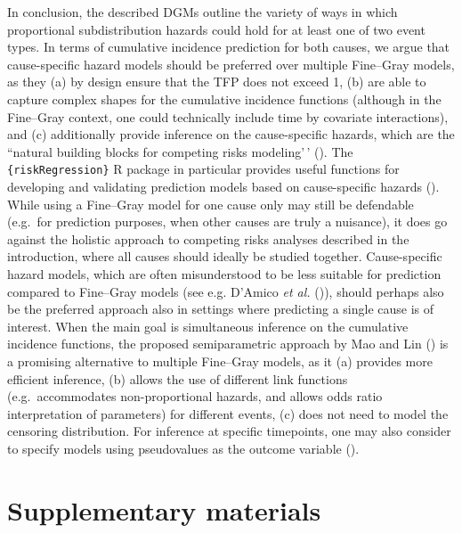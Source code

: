 \documentclass[
  letterpaper,
  paper=240mm:170mm,
  twoside=true,
  open=right,
  fontsize=10pt,
  pagesize=false,
  BCOR=15mm,
  DIV=14,
  headinclude=true,
  footinclude=false,
  headsepline=on]{scrbook}
\begin{document}
In conclusion, the described DGMs outline the variety of ways in which
proportional subdistribution hazards could hold for at least one of two
event types. In terms of cumulative incidence prediction for both
causes, we argue that cause-specific hazard models should be preferred
over multiple Fine--Gray models, as they (a) by design ensure that the
TFP does not exceed 1, (b) are able to capture complex shapes for the
cumulative incidence functions (although in the Fine--Gray context, one
could technically include time by covariate interactions), and (c)
additionally provide inference on the cause-specific hazards, which are
the ``natural building blocks for competing risks modeling'\,'
(). The \texttt{\{riskRegression\}} R package in particular
provides useful functions for developing and validating prediction
models based on cause-specific hazards
(). While using a
Fine--Gray model for one cause only may still be defendable (e.g.~for
prediction purposes, when other causes are truly a nuisance), it does go
against the holistic approach to competing risks analyses described in
the introduction, where all causes should ideally be studied together.
Cause-specific hazard models, which are often misunderstood to be less
suitable for prediction compared to Fine--Gray models (see e.g. D'Amico
\emph{et al.} ()),
should perhaps also be the preferred approach also in settings where
predicting a single cause is of interest. When the main goal is
simultaneous inference on the cumulative incidence functions, the
proposed semiparametric approach by Mao and Lin
() is a
promising alternative to multiple Fine--Gray models, as it (a) provides
more efficient inference, (b) allows the use of different link functions
(e.g.~accommodates non-proportional hazards, and allows odds ratio
interpretation of parameters) for different events, (c) does not need to
model the censoring distribution. For inference at specific timepoints,
one may also consider to specify models using pseudovalues as the
outcome variable
().

\section*{Supplementary materials}\label{supplementary-materials-4}
\end{document}
